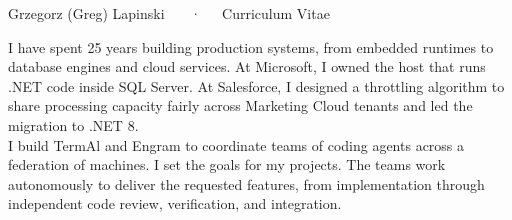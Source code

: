 \documentclass[11pt, letterpaper]{awesome-cv}
\begin{document}
\makecvheader

\makecvfooter
  {}
  {Grzegorz (Greg) Lapinski ~~~·~~~Curriculum Vitae}
  {\thepage}


\par
\begin{cvparagraph}
I have spent 25 years building production systems, from embedded runtimes to database engines and cloud services. At Microsoft, I owned the host that runs .NET code inside SQL Server. At Salesforce, I designed a throttling algorithm to share processing capacity fairly across Marketing Cloud tenants and led the migration to .NET 8.\\
I build TermAl and Engram to coordinate teams of coding agents across a federation of machines. I set the goals for my projects. The teams work autonomously to deliver the requested features, from implementation through independent code review, verification, and integration.
\end{cvparagraph}





\ifdefined\IncludeRecruitmentConsent
  
\fi
%
%
%
%
%
%


\end{document}
